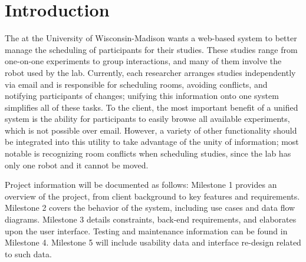 \section{Introduction}
The  at the University of Wisconsin-Madison wants a web-based system to better manage the scheduling of participants for their studies.  These studies range from one-on-one experiments to group interactions, and many of them involve the robot used by the lab.  Currently, each researcher arranges studies independently via email and is responsible for scheduling rooms, avoiding conflicts, and notifying participants of changes; unifying this information onto one system simplifies all of these tasks.  To the client, the most important benefit of a unified system is the ability for participants to easily browse all available experiments, which is not possible over email.  However, a variety of other functionality should be integrated into this utility to take advantage of the unity of information; most notable is recognizing room conflicts when scheduling studies, since the lab has only one robot and it cannot be moved.\cite{website:HCI}

Project information will be documented as follows:  Milestone 1 provides an overview of the project, from client background to key features and requirements.  Milestone 2 covers the behavior of the system, including use cases and data flow diagrams.  Milestone 3 details constraints, back-end requirements, and elaborates upon the user interface.  Testing and maintenance information can be found in Milestone 4.  Milestone 5 will include usability data and interface re-design related to such data.